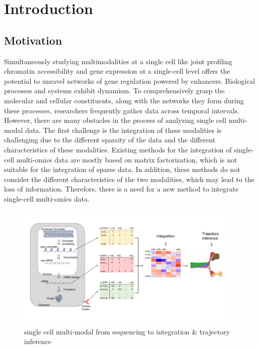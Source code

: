 \chapter{Introduction}
\label{chapter:introduction}

\graphicspath{{chapter1/figs/}}


\section{Motivation}
\label{introduction:sec1.motivation}

Simultaneously studying multimodalities at a single cell like joint profiling chromatin accessibility and gene expression at a single-cell level offers the potential to unravel networks of gene regulation powered by enhancers. Biological processes and systems exhibit dynamism. To comprehensively grasp the molecular and cellular constituents, along with the networks they form during these processes, researchers frequently gather data across temporal intervals. However, there are many obstacles in the process of analyzing single cell multi-modal data. The first challenge is the integration of these modalities is challenging due to the different sparsity of the data and the different characteristics of these modalities. Existing methods for the integration of single-cell multi-omics data are mostly based on matrix factorization, which is not suitable for the integration of sparse data. In addition, these methods do not consider the different characteristics of the two modalities, which may lead to the loss of information. Therefore, there is a need for a new method to integrate single-cell multi-omics data.



\begin{figure}[!ht]
	\centering
	\includegraphics[width=0.95\textwidth]{multimodal_schematic/fig}
	\vspace{0.1cm}
	\caption[single cell multi-modal from sequencing to integration \& trajectory inference]{single cell multi-modal from sequencing to integration \& trajectory inference}
	\label{fig:sc_mulitmodal_sequencing_to_integration_ti}
\end{figure}



